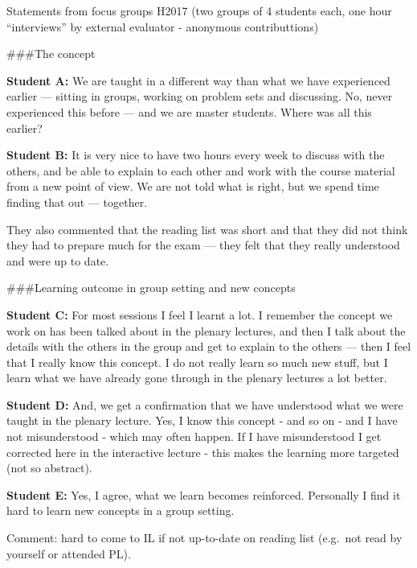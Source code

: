 \documentclass[
  ignorenonframetext,
]{beamer}
\begin{document}
\begin{frame}
\begin{block}{Statements from focus groups H2017}
\protect\hypertarget{statements-from-focus-groups-h2017}{}
(two groups of 4 students each, one hour ``interviews'' by external
evaluator - anonymous contributtions)

\#\#\#The concept

\textbf{Student A:} We are taught in a different way than what we have
experienced earlier --- sitting in groups, working on problem sets and
discussing. No, never experienced this before --- and we are master
students. Where was all this earlier?

\textbf{Student B:} It is very nice to have two hours every week to
discuss with the others, and be able to explain to each other and work
with the course material from a new point of view. We are not told what
is right, but we spend time finding that out --- together.

They also commented that the reading list was short and that they did
not think they had to prepare much for the exam --- they felt that they
really understood and were up to date.
\end{block}
\end{frame}

\begin{frame}
\#\#\#Learning outcome in group setting and new concepts

\textbf{Student C:} For most sessions I feel I learnt a lot. I remember
the concept we work on has been talked about in the plenary lectures,
and then I talk about the details with the others in the group and get
to explain to the others --- then I feel that I really know this
concept. I do not really learn so much new stuff, but I learn what we
have already gone through in the plenary lectures a lot better.

\textbf{Student D:} And, we get a confirmation that we have understood
what we were taught in the plenary lecture. Yes, I know this concept -
and so on - and I have not misunderstood - which may often happen. If I
have misunderstood I get corrected here in the interactive lecture -
this makes the learning more targeted (not so abstract).

\textbf{Student E:} Yes, I agree, what we learn becomes reinforced.
Personally I find it hard to learn new concepts in a group setting.

Comment: hard to come to IL if not up-to-date on reading list (e.g.~not
read by yourself or attended PL).
\end{frame}
\end{document}
